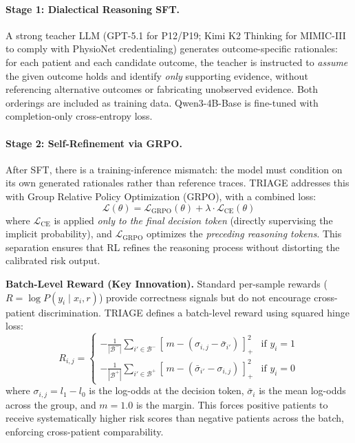 \documentclass[11pt,a4paper]{article}
\begin{document}
\paragraph{Stage 1: Dialectical Reasoning SFT.} A strong teacher LLM (GPT-5.1 for P12/P19; Kimi K2 Thinking for MIMIC-III to comply with PhysioNet credentialing) generates outcome-specific rationales: for each patient and each candidate outcome, the teacher is instructed to \emph{assume} the given outcome holds and identify \emph{only} supporting evidence, without referencing alternative outcomes or fabricating unobserved evidence. Both orderings are included as training data. Qwen3-4B-Base is fine-tuned with completion-only cross-entropy loss.

\paragraph{Stage 2: Self-Refinement via GRPO.} After SFT, there is a training-inference mismatch: the model must condition on its own generated rationales rather than reference traces. TRIAGE addresses this with Group Relative Policy Optimization (GRPO), with a combined loss:
\begin{equation}
\mathcal{L}(\theta) = \mathcal{L}_{\mathrm{GRPO}}(\theta) + \lambda \cdot \mathcal{L}_{\mathrm{CE}}(\theta)
\end{equation}
where $\mathcal{L}_{\mathrm{CE}}$ is applied \emph{only to the final decision token} (directly supervising the implicit probability), and $\mathcal{L}_{\mathrm{GRPO}}$ optimizes the \emph{preceding reasoning tokens}. This separation ensures that RL refines the reasoning process without distorting the calibrated risk output.

\textbf{Batch-Level Reward (Key Innovation).} Standard per-sample rewards ($R = \log P(y_i \mid x_i, r)$) provide correctness signals but do not encourage cross-patient discrimination. TRIAGE defines a batch-level reward using squared hinge loss:
\begin{equation}
R_{i,j} = \begin{cases}
-\frac{1}{|\mathcal{B}^-|} \sum_{i' \in \mathcal{B}^-} [\,m - (\sigma_{i,j} - \bar{\sigma}_{i'})\,]_+^2 & \text{if } y_i = 1 \\[4pt]
-\frac{1}{|\mathcal{B}^+|} \sum_{i' \in \mathcal{B}^+} [\,m - (\bar{\sigma}_{i'} - \sigma_{i,j})\,]_+^2 & \text{if } y_i = 0
\end{cases}
\end{equation}
where $\sigma_{i,j} = l_1 - l_0$ is the log-odds at the decision token, $\bar{\sigma}_i$ is the mean log-odds across the group, and $m=1.0$ is the margin. This forces positive patients to receive systematically higher risk scores than negative patients across the batch, enforcing cross-patient comparability.
\end{document}
